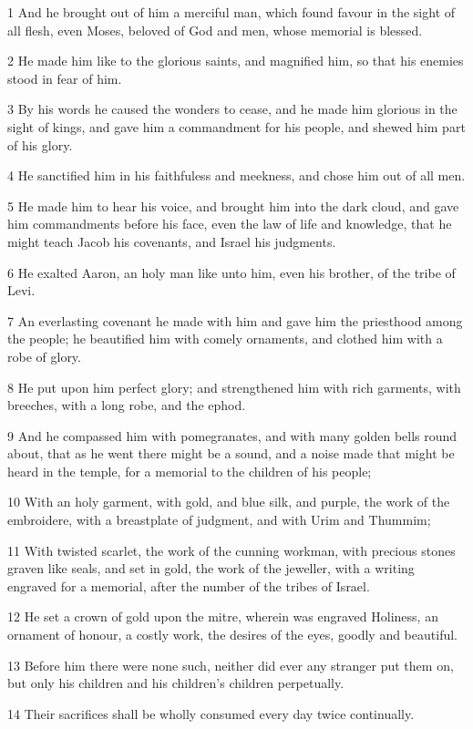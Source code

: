\par 1 And he brought out of him a merciful man, which found favour in the sight of all flesh, even Moses, beloved of God and men, whose memorial is blessed.
\par 2 He made him like to the glorious saints, and magnified him, so that his enemies stood in fear of him.
\par 3 By his words he caused the wonders to cease, and he made him glorious in the sight of kings, and gave him a commandment for his people, and shewed him part of his glory.
\par 4 He sanctified him in his faithfuless and meekness, and chose him out of all men.
\par 5 He made him to hear his voice, and brought him into the dark cloud, and gave him commandments before his face, even the law of life and knowledge, that he might teach Jacob his covenants, and Israel his judgments.
\par 6 He exalted Aaron, an holy man like unto him, even his brother, of the tribe of Levi.
\par 7 An everlasting covenant he made with him and gave him the priesthood among the people; he beautified him with comely ornaments, and clothed him with a robe of glory.
\par 8 He put upon him perfect glory; and strengthened him with rich garments, with breeches, with a long robe, and the ephod.
\par 9 And he compassed him with pomegranates, and with many golden bells round about, that as he went there might be a sound, and a noise made that might be heard in the temple, for a memorial to the children of his people;
\par 10 With an holy garment, with gold, and blue silk, and purple, the work of the embroidere, with a breastplate of judgment, and with Urim and Thummim;
\par 11 With twisted scarlet, the work of the cunning workman, with precious stones graven like seals, and set in gold, the work of the jeweller, with a writing engraved for a memorial, after the number of the tribes of Israel.
\par 12 He set a crown of gold upon the mitre, wherein was engraved Holiness, an ornament of honour, a costly work, the desires of the eyes, goodly and beautiful.
\par 13 Before him there were none such, neither did ever any stranger put them on, but only his children and his children's children perpetually.
\par 14 Their sacrifices shall be wholly consumed every day twice continually.
